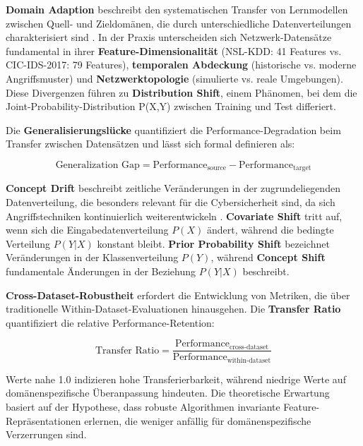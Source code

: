 \documentclass[11pt,a4paper]{article}
\begin{document}
    \textbf{Domain Adaption} beschreibt den systematischen Transfer von Lernmodellen zwischen Quell- und Zieldomänen, die durch unterschiedliche Datenverteilungen charakterisiert sind \parencite{Goodfellow2016}. In der Praxis unterscheiden sich Netzwerk-Datensätze fundamental in ihrer \textbf{Feature-Dimensionalität} (NSL-KDD: 41 Features vs. CIC-IDS-2017: 79 Features), \textbf{temporalen Abdeckung} (historische vs. moderne Angriffsmuster) und \textbf{Netzwerktopologie} (simulierte vs. reale Umgebungen). Diese Divergenzen führen zu \textbf{Distribution Shift}, einem Phänomen, bei dem die Joint-Probability-Distribution P(X,Y) zwischen Training und Test differiert.

    Die \textbf{Generalisierungslücke} quantifiziert die Performance-Degradation beim Transfer zwischen Datensätzen und lässt sich formal definieren als:

    \begin{equation}
        \text{Generalization Gap} = \text{Performance}_{\text{source}} - \text{Performance}_{\text{target}}
    \end{equation}

    \textbf{Concept Drift} beschreibt zeitliche Veränderungen in der zugrundeliegenden Datenverteilung, die besonders relevant für die Cybersicherheit sind, da sich Angriffstechniken kontinuierlich weiterentwickeln \parencite{Ring2019}. \textbf{Covariate Shift} tritt auf, wenn sich die Eingabedatenverteilung $P(X)$ ändert, während die bedingte Verteilung $P(Y|X)$ konstant bleibt. \textbf{Prior Probability Shift} bezeichnet Veränderungen in der Klassenverteilung $P(Y)$, während \textbf{Concept Shift} fundamentale Änderungen in der Beziehung $P(Y|X)$ beschreibt.

    \textbf{Cross-Dataset-Robustheit} erfordert die Entwicklung von Metriken, die über traditionelle Within-Dataset-Evaluationen hinausgehen. Die \textbf{Transfer Ratio} quantifiziert die relative Performance-Retention:

    \begin{equation}
        \text{Transfer Ratio} = \frac{\text{Performance}_{\text{cross-dataset}}}{\text{Performance}_{\text{within-dataset}}}
    \end{equation}

    Werte nahe 1.0 indizieren hohe Transferierbarkeit, während niedrige Werte auf domänenspezifische Überanpassung hindeuten. Die theoretische Erwartung basiert auf der Hypothese, dass robuste Algorithmen invariante Feature-Repräsentationen erlernen, die weniger anfällig für domänenspezifische Verzerrungen sind.
\end{document}
